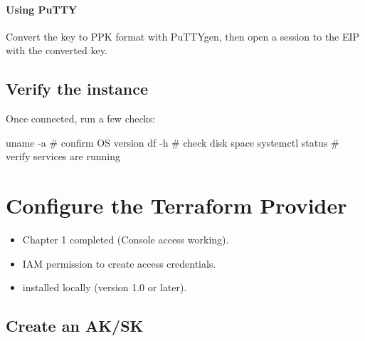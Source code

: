 \documentclass[english]{labguide}
\begin{document}
\paragraph{Using PuTTY}
Convert the key to PPK format with PuTTYgen, then open a session to the
EIP with the converted key.

\subsection{Verify the instance}

Once connected, run a few checks:

\begin{codigo}[bash]
uname -a          # confirm OS version
df -h             # check disk space
systemctl status  # verify services are running
\end{codigo}


\section{Configure the Terraform Provider}

\begin{objetivos}

  \prerequisitos
  \begin{itemize}
    \item Chapter 1 completed (Console access working).
    \item IAM permission to create access credentials.
    \item {} installed locally (version 1.0 or later).
  \end{itemize}
\end{objetivos}

\subsection{Create an AK/SK}
\end{document}

